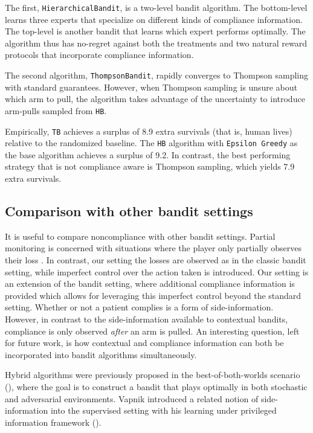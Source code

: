 The first, \texttt{HierarchicalBandit}, is a two-level bandit algorithm. The bottom-level learns three experts that specialize on different kinds of compliance information. The top-level is another bandit that learns which expert performs optimally. The algorithm thus has no-regret against both the treatments and two natural reward protocols that incorporate compliance information.

The second algorithm, \texttt{ThompsonBandit}, rapidly converges to Thompson sampling with standard guarantees. However, when Thompson sampling is unsure about which arm to pull, the algorithm takes advantage of the uncertainty to introduce arm-pulls sampled from \texttt{HB}.

Empirically, \texttt{TB} achieves a surplus of 8.9 extra survivals (that is, human lives) relative to the randomized baseline.
The \texttt{HB} algorithm with \texttt{Epsilon Greedy} as the base algorithm achieves a surplus of 9.2.
In contrast, the best performing strategy that is not compliance aware is Thompson sampling, which yields 7.9 extra survivals.



\subsection{Comparison with other bandit settings}

It is useful to compare noncompliance with other bandit settings. Partial monitoring is concerned with situations where the player only partially observes their loss \cite{alon:15}. In contrast, our setting the losses are observed as in the classic bandit setting, while imperfect control over the action taken is introduced.  Our setting is an extension of the bandit setting, where additional compliance information is provided which allows for leveraging this imperfect control beyond the standard setting. Whether or not a patient complies is a form of side-information. However, in contrast to the side-information available to contextual bandits, compliance is only observed \emph{after} an arm is pulled. An interesting question, left for future work, is how contextual and compliance information can both be incorporated into bandit algorithms simultaneously. 

Hybrid algorithms were previously proposed in the best-of-both-worlds scenario (\cite{bubeck:12a,seldin:14}), where the goal is to construct a bandit that plays optimally in both stochastic and adversarial environments. Vapnik introduced a related notion of side-information into the supervised setting with his learning under privileged information framework (\cite{vapnik:09}). 

